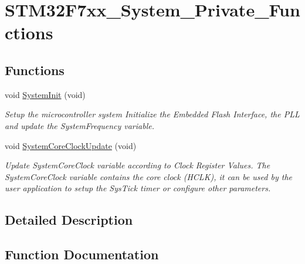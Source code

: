 \hypertarget{group___s_t_m32_f7xx___system___private___functions}{}\section{S\+T\+M32\+F7xx\+\_\+\+System\+\_\+\+Private\+\_\+\+Functions}
\label{group___s_t_m32_f7xx___system___private___functions}
\subsection*{Functions}
\begin{DoxyCompactItemize}
\item 
void \mbox{\hyperlink{group___s_t_m32_f7xx___system___private___functions_ga93f514700ccf00d08dbdcff7f1224eb2}{System\+Init}} (void)
\begin{DoxyCompactList}\small\item\em Setup the microcontroller system Initialize the Embedded Flash Interface, the P\+LL and update the System\+Frequency variable. \end{DoxyCompactList}\item 
void \mbox{\hyperlink{group___s_t_m32_f7xx___system___private___functions_gae0c36a9591fe6e9c45ecb21a794f0f0f}{System\+Core\+Clock\+Update}} (void)
\begin{DoxyCompactList}\small\item\em Update System\+Core\+Clock variable according to Clock Register Values. The System\+Core\+Clock variable contains the core clock (H\+C\+LK), it can be used by the user application to setup the Sys\+Tick timer or configure other parameters. \end{DoxyCompactList}\end{DoxyCompactItemize}


\subsection{Detailed Description}


\subsection{Function Documentation}
\mbox{\label{group___s_t_m32_f7xx___system___private___functions_gae0c36a9591fe6e9c45ecb21a794f0f0f}} 
